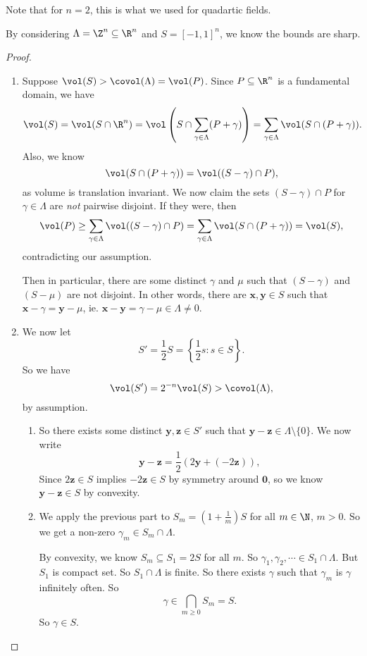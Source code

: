 \documentclass[a4paper]{article}
\begin{document}
Note that for $n = 2$, this is what we used for quadartic fields.

By considering $\Lambda = \Z^n \subseteq \R^n$ and $S = [-1, 1]^n$, we know the bounds are sharp.

\begin{proof}\leavevmode
  \begin{enumerate}
    \item Suppose $\vol(S) > \covol(\Lambda) = \vol(P)$. Since $P \subseteq \R^n$ is a fundamental domain, we have
      \[
        \vol(S) = \vol(S \cap \R^n) = \vol\left(S \cap \sum_{\gamma \in \Lambda} (P + \gamma)\right) = \sum_{\gamma \in \Lambda} \vol(S \cap (P + \gamma)).
      \]
      Also, we know
      \[
        \vol(S \cap (P + \gamma)) = \vol((S - \gamma) \cap P),
      \]
      as volume is translation invariant. We now claim the sets $(S - \gamma) \cap P$ for $\gamma \in \Lambda$ are \emph{not} pairwise disjoint. If they were, then
      \[
        \vol(P) \geq \sum_{\gamma \in \Lambda} \vol((S - \gamma) \cap P) = \sum_{\gamma \in \Lambda} \vol(S \cap (P + \gamma)) = \vol(S),
      \]
      contradicting our assumption.

      Then in particular, there are some distinct $\gamma$ and $\mu$ such that $(S - \gamma)$ and $(S - \mu)$ are not disjoint. In other words, there are $\mathbf{x}, \mathbf{y} \in S$ such that $\mathbf{x} - \gamma = \mathbf{y} - \mu$, ie. $\mathbf{x} - \mathbf{y} = \gamma - \mu \in \Lambda \not= 0$.
    \item We now let
      \[
        S' = \frac{1}{2} S = \left\{\frac{1}{2}s: s \in S\right\}.
      \]
      So we have
      \[
        \vol(S') = 2^{-n} \vol(S) > \covol(\Lambda),
      \]
      by assumption.
      \begin{enumerate}
        \item So there exists some distinct $\mathbf{y}, \mathbf{z} \in S'$ such that $\mathbf{y} - \mathbf{z} \in \Lambda \setminus \{0\}$. We now write
          \[
            \mathbf{y} - \mathbf{z} = \frac{1}{2} (2\mathbf{y} + (-2\mathbf{z})),
          \]
          Since $2\mathbf{z} \in S$ implies $-2\mathbf{z} \in S$ by symmetry around $\mathbf{0}$, so we know $\mathbf{y} - \mathbf{z} \in S$ by convexity.
        \item We apply the previous part to $S_m = \left(1 + \frac{1}{m}\right)S$ for all $m \in \N$, $m > 0$. So we get a non-zero $\gamma_m \in S_m \cap \Lambda$.

          By convexity, we know $S_m \subseteq S_1 = 2S$ for all $m$. So $\gamma_1, \gamma_2, \cdots \in S_1 \cap \Lambda$. But $S_1$ is compact set. So $S_1 \cap \Lambda$ is finite. So there exists $\gamma$ such that $\gamma_m$ is $\gamma$ infinitely often. So
          \[
            \gamma \in \bigcap_{m \geq 0} S_m = S.
          \]
          So $\gamma \in S$.
      \end{enumerate}
  \end{enumerate}
\end{proof}
\end{document}
